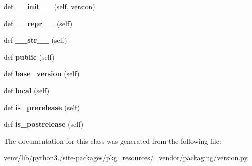 \begin{DoxyCompactItemize}
\item 
\mbox{\label{classpkg__resources_1_1__vendor_1_1packaging_1_1version_1_1_version_a97ad57a694c484875decb960f85d5b57}} 
def {\bfseries \+\_\+\+\_\+init\+\_\+\+\_\+} (self, version)
\item 
\mbox{\label{classpkg__resources_1_1__vendor_1_1packaging_1_1version_1_1_version_a89c03b05e97a313b8a4909b6549cea3d}} 
def {\bfseries \+\_\+\+\_\+repr\+\_\+\+\_\+} (self)
\item 
\mbox{\label{classpkg__resources_1_1__vendor_1_1packaging_1_1version_1_1_version_a9a90e18e451e2e46f4cecb59e159d3d7}} 
def {\bfseries \+\_\+\+\_\+str\+\_\+\+\_\+} (self)
\item 
\mbox{\label{classpkg__resources_1_1__vendor_1_1packaging_1_1version_1_1_version_aec799e789b1eaf7697167fa8937a059f}} 
def {\bfseries public} (self)
\item 
\mbox{\label{classpkg__resources_1_1__vendor_1_1packaging_1_1version_1_1_version_aca9d11c5fa065f97a1dc0475bc55edf3}} 
def {\bfseries base\+\_\+version} (self)
\item 
\mbox{\label{classpkg__resources_1_1__vendor_1_1packaging_1_1version_1_1_version_a42fcad5b56f4cba8bb585c85b4d823e6}} 
def {\bfseries local} (self)
\item 
\mbox{\label{classpkg__resources_1_1__vendor_1_1packaging_1_1version_1_1_version_a218307c7e6f5e0d40795560b6ec905d5}} 
def {\bfseries is\+\_\+prerelease} (self)
\item 
\mbox{\label{classpkg__resources_1_1__vendor_1_1packaging_1_1version_1_1_version_af9bfffa937f9cf6206e4bd6c183bbb2d}} 
def {\bfseries is\+\_\+postrelease} (self)
\end{DoxyCompactItemize}


The documentation for this class was generated from the following file\+:\begin{DoxyCompactItemize}
\item 
venv/lib/python3./site-\/packages/pkg\+\_\+resources/\+\_\+vendor/packaging/version.\+py\end{DoxyCompactItemize}
